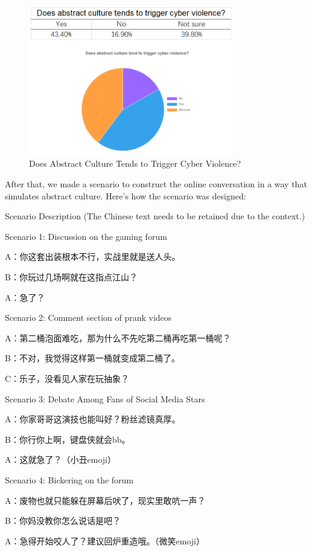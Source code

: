 \documentclass[12pt,a4paper]{ctexart}
\theoremstyle{MyLineTheoremStyle}
\theoremstyle{MyBlockTheoremStyle}
\theoremstyle{MySubsubsectionStyle}
\begin{document}
\begin{figure}[htbp]
    \centering
    \includegraphics[width=0.8\textwidth]{img/abstract_vs_net_violence.png}
    \caption{Does Abstract Culture Tends to Trigger Cyber Violence?}
    \label{fig:abstract_vs_net_violence}
\end{figure}
\newpage

After that, we made a scenario to construct the online conversation in a way that simulates abstract culture. Here's how the scenario was designed:

Scenario Description (The Chinese text needs to be retained due to the context.)

Scenario 1: Discussion on the gaming forum

A：你这套出装根本不行，实战里就是送人头。

B：你玩过几场啊就在这指点江山？

A：急了？

Scenario 2: Comment section of prank videos

A：第二桶泡面难吃，那为什么不先吃第二桶再吃第一桶呢？

B：不对，我觉得这样第一桶就变成第二桶了。

C：乐子，没看见人家在玩抽象？

Scenario 3: Debate Among Fans of Social Media Stars

A：你家哥哥这演技也能叫好？粉丝滤镜真厚。

B：你行你上啊，键盘侠就会bb。

A：这就急了？（小丑emoji）

Scenario 4: Bickering on the forum

A：废物也就只能躲在屏幕后吠了，现实里敢吭一声？

B：你妈没教你怎么说话是吧？

A：急得开始咬人了？建议回炉重造哦。（微笑emoji）
\end{document}

